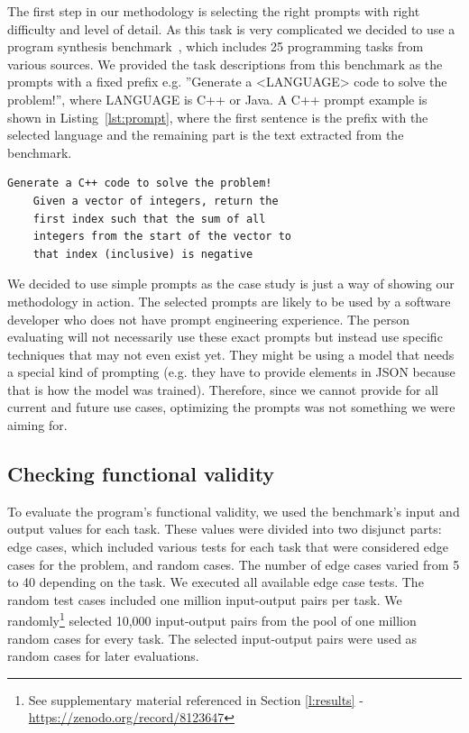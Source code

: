 The first step in our methodology is selecting the right prompts with right difficulty and level of detail.
As this task is very complicated we decided to use a program synthesis benchmark~\cite{codegen_benchmark}, which includes 25 programming tasks from various sources.
We provided the task descriptions from this benchmark as the prompts with a fixed prefix e.g. ''Generate a <LANGUAGE> code to solve the problem!'', where LANGUAGE is C++ or Java.
A C++ prompt example is shown in Listing~\ref{lst:prompt}, where the first sentence is the prefix with the selected language and the remaining part is the text extracted from the benchmark.
\begin{lstlisting}[basicstyle=\small, label=lst:prompt, caption=Example prompt for a C++ solution for the basement problem]
	Generate a C++ code to solve the problem!
	Given a vector of integers, return the
	first index such that the sum of all
	integers from the start of the vector to
	that index (inclusive) is negative
\end{lstlisting}
We decided to use simple prompts as the case study is just a way of showing our methodology in action.
The selected prompts are likely to be used by a software developer who does not have prompt engineering experience.
The person evaluating will not necessarily use these exact prompts but instead use specific techniques that may not even exist yet. They might be using a model that needs a special kind of prompting (e.g. they have to provide elements in JSON because that is how the model was trained).
Therefore, since we cannot provide for all current and future use cases, optimizing the prompts was not something we were aiming for.

\subsection{Checking functional validity}
\label{l:benchmark_evaluation}


To evaluate the program's functional validity, we used the benchmark's input and output values for each task.
These values were divided into two disjunct parts:
edge cases, which included various tests for each task that were considered edge cases for the problem, and random cases.
The number of edge cases varied from 5 to 40 depending on the task.
We executed all available edge case tests.
The random test cases included one million input-output pairs per task.
We randomly\footnote{See supplementary material referenced in Section \ref{l:results} - \url{https://zenodo.org/record/8123647}} selected 10,000 input-output pairs from the pool of one million random cases for every task.
The selected input-output pairs were used as random cases for later evaluations.

